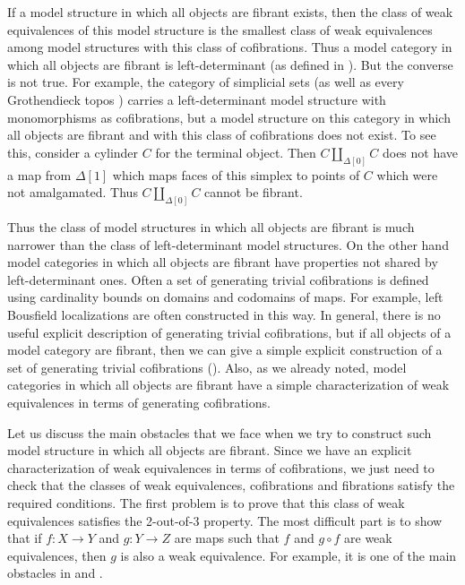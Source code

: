 \documentclass{tac}
\theoremstyle{definition}
\begin{document}
If a model structure in which all objects are fibrant exists, then the class of weak equivalences of this model structure
is the smallest class of weak equivalences among model structures with this class of cofibrations.
Thus a model category in which all objects are fibrant is left-determinant (as defined in \cite{left-det}).
But the converse is not true.
For example, the category of simplicial sets (as well as every Grothendieck topos \cite{cisinski})
carries a left-determinant model structure with monomorphisms as cofibrations,
but a model structure on this category in which all objects are fibrant and with this class of cofibrations does not exist.
To see this, consider a cylinder $C$ for the terminal object.
Then $C \amalg_{\Delta[0]} C$ does not have a map from $\Delta[1]$ which
maps faces of this simplex to points of $C$ which were not amalgamated.
Thus $C \amalg_{\Delta[0]} C$ cannot be fibrant.

Thus the class of model structures in which all objects are fibrant is much narrower than the class of left-determinant model structures.
On the other hand model categories in which all objects are fibrant have properties not shared by left-determinant ones.
Often a set of generating trivial cofibrations is defined using cardinality bounds on domains and codomains of maps.
For example, left Bousfield localizations are often constructed in this way.
In general, there is no useful explicit description of generating trivial cofibrations, but if all objects of a model category are fibrant,
then we can give a simple explicit construction of a set of generating trivial cofibrations ().
Also, as we already noted, model categories in which all objects are fibrant have a simple characterization of weak equivalences in terms of generating cofibrations.

Let us discuss the main obstacles that we face when we try to construct such model structure in which all objects are fibrant.
Since we have an explicit characterization of weak equivalences in terms of cofibrations,
we just need to check that the classes of weak equivalences, cofibrations and fibrations satisfy the required conditions.
The first problem is to prove that this class of weak equivalences satisfies the 2-out-of-3 property.
The most difficult part is to show that if $f : X \to Y$ and $g : Y \to Z$ are maps such that $f$ and $g \circ f$ are weak equivalences, then $g$ is also a weak equivalence.
For example, it is one of the main obstacles in \cite{folk} and \cite{alg-models}.
\end{document}
